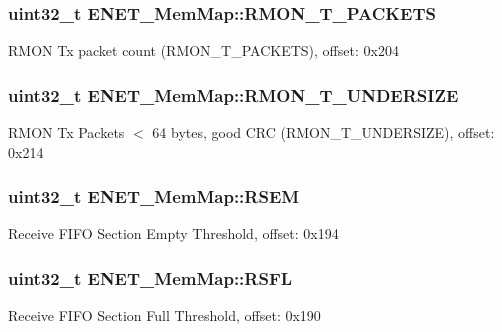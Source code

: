 \subsubsection[{R\+M\+O\+N\+\_\+\+T\+\_\+\+P\+A\+C\+K\+E\+T\+S}]{\setlength{\rightskip}{0pt plus 5cm}uint32\+\_\+t E\+N\+E\+T\+\_\+\+Mem\+Map\+::\+R\+M\+O\+N\+\_\+\+T\+\_\+\+P\+A\+C\+K\+E\+T\+S}\label{struct_e_n_e_t___mem_map_a50d2a3b07b1bc8cffcb140f1f1830aeb}
R\+M\+O\+N Tx packet count (R\+M\+O\+N\+\_\+\+T\+\_\+\+P\+A\+C\+K\+E\+T\+S), offset\+: 0x204 \hypertarget{struct_e_n_e_t___mem_map_aae80607f8598aca7702cb202de169cf2}{}
\subsubsection[{R\+M\+O\+N\+\_\+\+T\+\_\+\+U\+N\+D\+E\+R\+S\+I\+Z\+E}]{\setlength{\rightskip}{0pt plus 5cm}uint32\+\_\+t E\+N\+E\+T\+\_\+\+Mem\+Map\+::\+R\+M\+O\+N\+\_\+\+T\+\_\+\+U\+N\+D\+E\+R\+S\+I\+Z\+E}\label{struct_e_n_e_t___mem_map_aae80607f8598aca7702cb202de169cf2}
R\+M\+O\+N Tx Packets $<$ 64 bytes, good C\+R\+C (R\+M\+O\+N\+\_\+\+T\+\_\+\+U\+N\+D\+E\+R\+S\+I\+Z\+E), offset\+: 0x214 \hypertarget{struct_e_n_e_t___mem_map_a7b29420fd912f2263789017ce0b60b26}{}
\subsubsection[{R\+S\+E\+M}]{\setlength{\rightskip}{0pt plus 5cm}uint32\+\_\+t E\+N\+E\+T\+\_\+\+Mem\+Map\+::\+R\+S\+E\+M}\label{struct_e_n_e_t___mem_map_a7b29420fd912f2263789017ce0b60b26}
Receive F\+I\+F\+O Section Empty Threshold, offset\+: 0x194 \hypertarget{struct_e_n_e_t___mem_map_aec8499ed3e3703b3b6582cb99ccdf01b}{}
\subsubsection[{R\+S\+F\+L}]{\setlength{\rightskip}{0pt plus 5cm}uint32\+\_\+t E\+N\+E\+T\+\_\+\+Mem\+Map\+::\+R\+S\+F\+L}\label{struct_e_n_e_t___mem_map_aec8499ed3e3703b3b6582cb99ccdf01b}
Receive F\+I\+F\+O Section Full Threshold, offset\+: 0x190 \hypertarget{struct_e_n_e_t___mem_map_a7215c1d9494a9cdba3959c6b7626e9c6}{}
